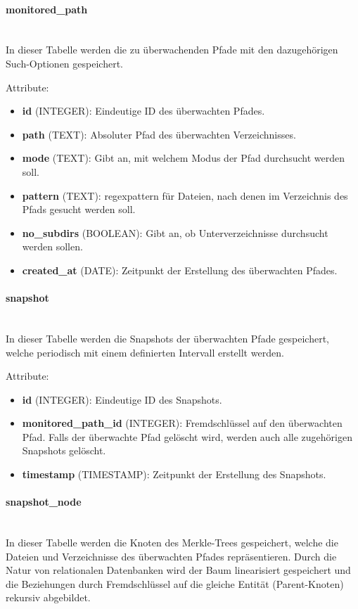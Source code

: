 \documentclass[a4paper,12pt]{report}
\begin{document}
    \paragraph*{monitored\_path}\mbox{}\\
    In dieser Tabelle werden die zu überwachenden Pfade mit den dazugehörigen Such-Optionen gespeichert.

    Attribute:
    \begin{itemize}
        \item \textbf{id} (INTEGER): Eindeutige ID des überwachten Pfades.
        \item \textbf{path} (TEXT): Absoluter Pfad des überwachten Verzeichnisses.
        \item \textbf{mode} (TEXT): Gibt an, mit welchem Modus der Pfad durchsucht werden soll.
        \item \textbf{pattern} (TEXT): \gls{regexpattern} für Dateien, nach denen im Verzeichnis des Pfads gesucht werden soll.
        \item \textbf{no\_subdirs} (BOOLEAN): Gibt an, ob Unterverzeichnisse durchsucht werden sollen.
        \item \textbf{created\_at} (DATE): Zeitpunkt der Erstellung des überwachten Pfades.
    \end{itemize}

    \paragraph*{snapshot}\mbox{}\\
    In dieser Tabelle werden die Snapshots der überwachten Pfade gespeichert,
    welche periodisch mit einem definierten Intervall erstellt werden.

    Attribute:
    \begin{itemize}
        \item \textbf{id} (INTEGER): Eindeutige ID des Snapshots.
        \item \textbf{monitored\_path\_id} (INTEGER): Fremdschlüssel auf den überwachten Pfad.
        Falls der überwachte Pfad gelöscht wird, werden auch alle zugehörigen Snapshots gelöscht.
        \item \textbf{timestamp} (TIMESTAMP): Zeitpunkt der Erstellung des Snapshots.
    \end{itemize}

    \paragraph*{snapshot\_node}\mbox{}\\
    In dieser Tabelle werden die Knoten des Merkle-Trees gespeichert, welche die Dateien und Verzeichnisse des überwachten Pfades repräsentieren.
    Durch die Natur von relationalen Datenbanken wird der Baum linearisiert gespeichert und die Beziehungen durch Fremdschlüssel auf die gleiche Entität (Parent-Knoten) rekursiv abgebildet.
\end{document}
